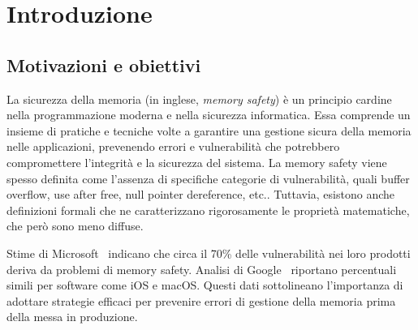\chapter{Introduzione}
\label{cha:introduction}

\section*{Motivazioni e obiettivi}
\label{sec:motivation} La sicurezza della memoria (in inglese, \textit{memory
safety}) è un principio cardine nella programmazione moderna e nella sicurezza
informatica. Essa comprende un insieme di pratiche e tecniche volte a garantire una
gestione sicura della memoria nelle applicazioni, prevenendo errori e
vulnerabilità che potrebbero compromettere l'integrità e la sicurezza del
sistema. La memory safety viene spesso definita come l'assenza di specifiche categorie
di vulnerabilità, quali buffer overflow, use after free, null pointer
dereference, etc.. Tuttavia, esistono anche definizioni formali che ne
caratterizzano rigorosamente le proprietà matematiche, che però sono meno diffuse.

Stime di Microsoft~\cite{microsoft_proactive_approach} indicano che circa il 70\%
delle vulnerabilità nei loro prodotti deriva da problemi di memory safety.
Analisi di Google~\cite{google_memory_safety} riportano percentuali simili per software
come iOS e macOS. Questi dati sottolineano l'importanza di adottare strategie
efficaci per prevenire errori di gestione della memoria prima della messa in
produzione.

